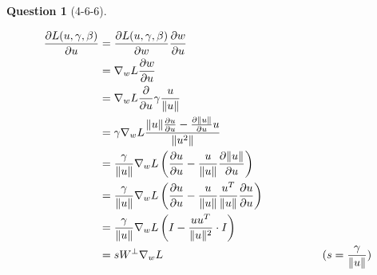 \documentclass[12pt]{article}
\theoremstyle{definition}
\newtheorem{exercise}{Question}%
\newcommand\tab[1][1cm]{\hspace*{#1}}
\newcommand{\pd}[2]{\frac{\partial#1}{\partial#2}}
\newcommand{\norm}[1]{\|#1\|}
\begin{document}
\begin{exercise}[4-6-6]
{\begin{enumerate}
{    \item {
    \begin{alignat*}{3}
    \pd{L(u, \gamma, \beta)}{u} &= \pd{L(u, \gamma, \beta)}{w}\pd{w}{u}
    \\
    &= \nabla_w L \pd{w}{u}
    \\
    &= \nabla_w L \pd{}{u} \gamma \frac{u}{\norm{u}}
    \\
    &= \gamma \nabla_w L \frac{\norm{u}\pd{u}{u} - \pd{\norm{u}}{u}u}{\norm{u^2}}
    \\
    &= \frac{\gamma}{\norm{u}} \nabla_w L \left ( \pd{u}{u} - \frac{u}{\norm{u}}\pd{\norm{u}}{u} \right )
    \\
    &= \frac{\gamma}{\norm{u}} \nabla_w L \left ( \pd{u}{u} - \frac{u}{\norm{u}}\frac{u^T}{\norm{u}}\pd{u}{u} \right )
    \\
    &= \frac{\gamma}{\norm{u}} \nabla_w L \left ( I - \frac{uu^T}{\norm{u}^2} \cdot I \right )
    \\
    &= s W^\perp \nabla_w L \tab[5.0cm] (s = \frac{\gamma}{\norm{u}})
    \end{alignat*}
    }
    }
\end{enumerate}

}
\end{exercise}
\end{document}
